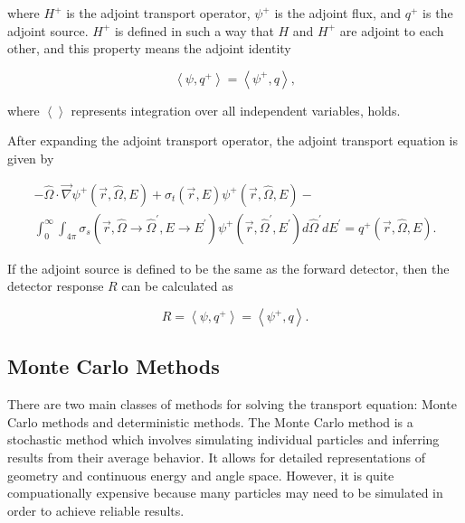 where $H^+$ is the adjoint transport operator, $\psi^+$ is the adjoint flux, and $q^+$ is the adjoint source.
$H^+$ is defined in such a way that $H$ and $H^+$ are adjoint to each other, and this property means the adjoint identity

\begin{equation}\label{eq:bg:rt:adjoint-identity}
  \left<\psi,q^+\right> =
  \left<\psi^+,q\right>,
\end{equation}

where $\left<\right>$ represents integration over all independent variables, holds.

After expanding the adjoint transport operator, the adjoint transport equation is given by

\begin{multline}\label{eq:bg:rt:adjoint-transport}
  -\hat{\Omega}\cdot\vec{\nabla}\psi^+\left(\vec{r},\hat{\Omega},E\right) +
  \sigma_t\left(\vec{r},E\right)\psi^+\left(\vec{r},\hat{\Omega},E\right) - \\
  \int_0^\infty\int_{4\pi}\sigma_s\left(\vec{r},\hat{\Omega}\rightarrow\hat{\Omega}^\prime,E\rightarrow E^\prime\right)\psi^+\left(\vec{r},\hat{\Omega}^\prime,E^\prime\right)d\hat{\Omega}^\prime dE^\prime =
  q^+\left(\vec{r},\hat{\Omega},E\right).
\end{multline}

If the adjoint source is defined to be the same as the forward detector, then the detector response $R$ can be calculated as

\begin{equation}\label{eq:bg:rt:detector-response}
  R = \left<\psi,q^+\right>
    = \left<\psi^+,q\right>.
\end{equation}


\subsection{Monte Carlo Methods}
\label{sec:bg:rt:mc}

There are two main classes of methods for solving the transport equation: Monte Carlo methods and deterministic methods.
The Monte Carlo method is a stochastic method which involves simulating individual particles and inferring results from their average behavior.
It allows for detailed representations of geometry and continuous energy and angle space.
However, it is quite compuationally expensive because many particles may need to be simulated in order to achieve reliable results.

